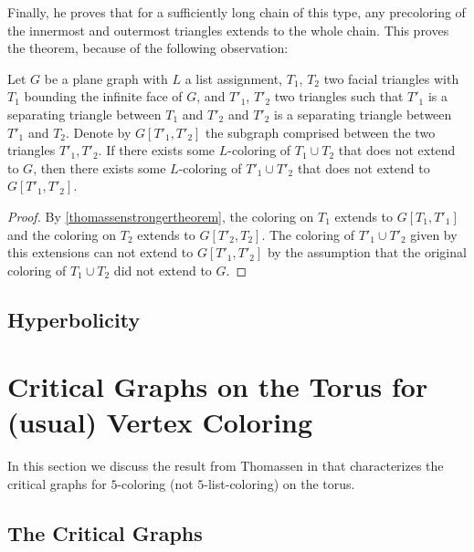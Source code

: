 
Finally, he proves that for a sufficiently long chain of this type, any precoloring of the innermost and outermost triangles extends to the whole chain. This proves the theorem, because of the following observation:

\begin{proposition}
	Let $G$ be a plane graph with $L$ a list assignment, $T_1$, $T_2$ 
	two facial triangles with $T_1$ bounding the infinite face of $G$, 
	and $T'_1$, $T'_2$ two triangles such that $T'_1$ is a separating 
	triangle between $T_1$ and $T'_2$ and $T'_2$ is a separating 
	triangle between $T'_1$ and $T_2$. Denote by $G[T'_1, T'_2]$ the 
	subgraph comprised between the two triangles $T'_1, T'_2$.  
	If there exists some $L$-coloring of $T_1 \cup T_2$ that does not 
	extend to $G$, then there exists some $L$-coloring of $T'_1 \cup T'_2$ 
	that does not extend to $G[T'_1, T'_2]$.
\end{proposition}

\begin{proof}
	By \ref{thomassenstrongertheorem}, the coloring on $T_1$ extends to 
	$G[T_1, T'_1]$ and the coloring on $T_2$ extends to $G[T'_2, T_2]$. 
	The coloring of $T'_1 \cup T'_2$ given by this extensions can not 
	extend to $G[T'_1, T'_2]$ by the assumption that the original coloring 
	of $T_1 \cup T_2$ did not extend to $G$.
\end{proof}

\subsection{Hyperbolicity}

\section{Critical Graphs on the Torus for (usual) Vertex Coloring}

In this section we discuss the result from Thomassen in \cite{thomassentorus} that characterizes the critical graphs for $5$-coloring (not $5$-list-coloring) on the torus.

\subsection{The Critical Graphs}

